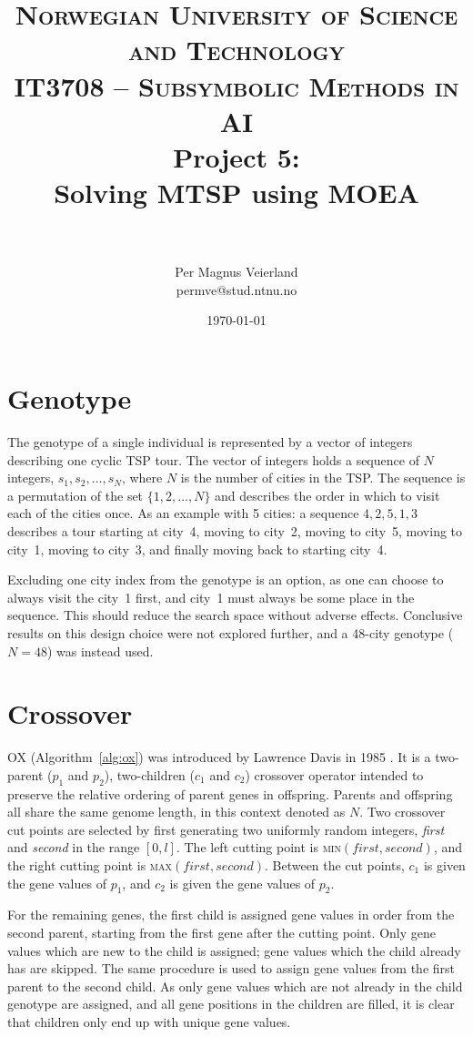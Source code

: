 \documentclass[paper=a4, fontsize=10pt]{scrartcl}
\title{
\normalfont \normalsize
\textsc{Norwegian University of Science and Technology\\IT3708 -- Subsymbolic Methods in AI}
\horrule{0.5pt} \\[0.4cm]
\huge Project 5:\\ Solving \ac{MTSP} using \ac{MOEA}\\
\horrule{2pt} \\[0.5cm]
}
\author{Per Magnus Veierland\\permve@stud.ntnu.no}
\date{\normalsize\today}
\begin{document}
\maketitle

\section*{Genotype}

The genotype of a single individual is represented by a vector of integers describing one cyclic \ac{TSP} tour. The vector of integers holds a sequence of $N$ integers, $s_1, s_2, \dots, s_N$, where $N$ is the number of cities in the \ac{TSP}. The sequence is a permutation of the set $\{1, 2, \ldots, N\}$ and describes the order in which to visit each of the cities once. As an example with 5 cities: a sequence $4, 2, 5, 1, 3$ describes a tour starting at city~4, moving to city~2, moving to city~5, moving to city~1, moving to city~3, and finally moving back to starting city~4.

Excluding one city index from the genotype is an option, as one can choose to always visit the city~1 first, and city~1 must always be some place in the sequence. This should reduce the search space without adverse effects. Conclusive results on this design choice were not explored further, and a 48-city genotype ($N=48$) was instead used.

\section*{Crossover}

\setlength\parindent{17pt}

\ac{OX} (Algorithm~\ref{alg:ox}) was introduced by Lawrence Davis in 1985 \cite{davis1985applying}. It is a two-parent ($p_1$ and $p_2$), two-children ($c_1$ and $c_2$) crossover operator intended to preserve the relative ordering of parent genes in offspring. Parents and offspring all share the same genome length, in this context denoted as $N$. Two crossover cut points are selected by first generating two uniformly random integers, \textit{first} and \textit{second} in the range $[0,l]$. The left cutting point is \textsc{min}$(\textit{first}, \textit{second})$, and the right cutting point is \textsc{max}$(\textit{first}, \textit{second})$. Between the cut points, $c_1$ is given the gene values of $p_1$, and $c_2$ is given the gene values of $p_2$.

For the remaining genes, the first child is assigned gene values in order from the second parent, starting from the first gene after the cutting point. Only gene values which are new to the child is assigned; gene values which the child already has are skipped. The same procedure is used to assign gene values from the first parent to the second child. As only gene values which are not already in the child genotype are assigned, and all gene positions in the children are filled, it is clear that children only end up with unique gene values.
\end{document}
